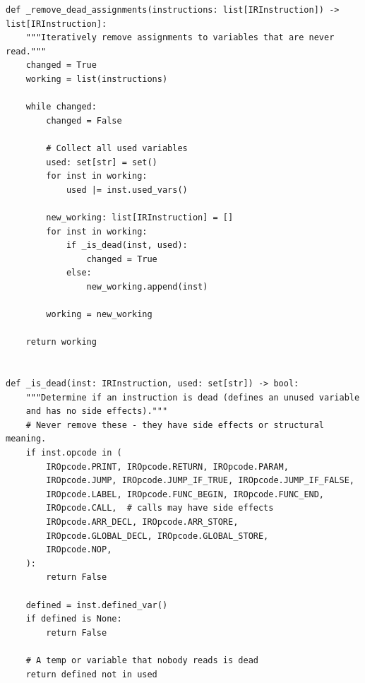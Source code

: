\begin{lstlisting}[style=snippet]
def _remove_dead_assignments(instructions: list[IRInstruction]) -> list[IRInstruction]:
    """Iteratively remove assignments to variables that are never read."""
    changed = True
    working = list(instructions)

    while changed:
        changed = False

        # Collect all used variables
        used: set[str] = set()
        for inst in working:
            used |= inst.used_vars()

        new_working: list[IRInstruction] = []
        for inst in working:
            if _is_dead(inst, used):
                changed = True
            else:
                new_working.append(inst)

        working = new_working

    return working


def _is_dead(inst: IRInstruction, used: set[str]) -> bool:
    """Determine if an instruction is dead (defines an unused variable
    and has no side effects)."""
    # Never remove these - they have side effects or structural meaning.
    if inst.opcode in (
        IROpcode.PRINT, IROpcode.RETURN, IROpcode.PARAM,
        IROpcode.JUMP, IROpcode.JUMP_IF_TRUE, IROpcode.JUMP_IF_FALSE,
        IROpcode.LABEL, IROpcode.FUNC_BEGIN, IROpcode.FUNC_END,
        IROpcode.CALL,  # calls may have side effects
        IROpcode.ARR_DECL, IROpcode.ARR_STORE,
        IROpcode.GLOBAL_DECL, IROpcode.GLOBAL_STORE,
        IROpcode.NOP,
    ):
        return False

    defined = inst.defined_var()
    if defined is None:
        return False

    # A temp or variable that nobody reads is dead
    return defined not in used
\end{lstlisting}

